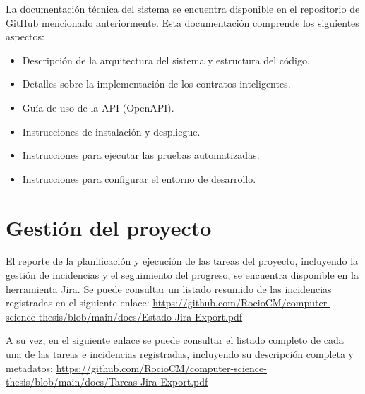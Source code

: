 La documentación técnica del sistema se encuentra disponible en el repositorio de GitHub mencionado anteriormente. Esta documentación comprende los siguientes aspectos:

\begin{itemize}
	\item Descripción de la arquitectura del sistema y estructura del código.
	\item Detalles sobre la implementación de los contratos inteligentes.
	\item Guía de uso de la API (OpenAPI).
	\item Instrucciones de instalación y despliegue.
	\item Instrucciones para ejecutar las pruebas automatizadas.
	\item Instrucciones para configurar el entorno de desarrollo.
\end{itemize}

\section{Gestión del proyecto}

El reporte de la planificación y ejecución de las tareas del proyecto, incluyendo la gestión de incidencias y el seguimiento del progreso, se encuentra disponible en la herramienta Jira. Se puede consultar un listado resumido de las incidencias registradas en el siguiente enlace: \url{https://github.com/RocioCM/computer-science-thesis/blob/main/docs/Estado-Jira-Export.pdf}

A su vez, en el siguiente enlace se puede consultar el listado completo de cada una de las tareas e incidencias registradas, incluyendo su descripción completa y metadatos: \url{https://github.com/RocioCM/computer-science-thesis/blob/main/docs/Tareas-Jira-Export.pdf}
